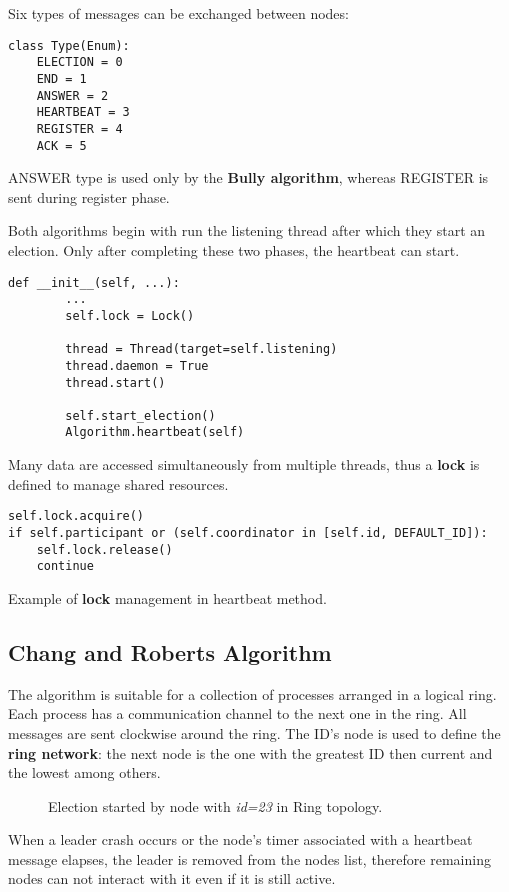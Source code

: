 \documentclass[conference]{IEEEtran}
\begin{document}
Six types of messages can be exchanged between nodes:

\begin{lstlisting}
class Type(Enum):
    ELECTION = 0
    END = 1
    ANSWER = 2
    HEARTBEAT = 3
    REGISTER = 4
    ACK = 5
\end{lstlisting}
ANSWER type is used only by the \textbf{Bully algorithm}, whereas REGISTER is sent during register phase.

Both algorithms begin with run the listening thread after which they start an election. Only after completing these two phases, the heartbeat can start. 
\begin{lstlisting}
def __init__(self, ...):
        ...
        self.lock = Lock()
        
        thread = Thread(target=self.listening)
        thread.daemon = True
        thread.start()

        self.start_election()
        Algorithm.heartbeat(self)
\end{lstlisting}
Many data are accessed simultaneously from multiple threads, thus a \textbf{lock} is defined to manage shared resources.
\begin{lstlisting}
self.lock.acquire()
if self.participant or (self.coordinator in [self.id, DEFAULT_ID]):
    self.lock.release()
    continue
\end{lstlisting}\caption{Example of \textbf{lock} management in heartbeat method.}

\subsection{Chang and Roberts Algorithm}\label{ring}

The algorithm is suitable for a collection of processes arranged in a logical ring. Each process has a
communication channel to the next one in the ring. All messages
are sent clockwise around the ring. The ID's node is used to define the \textbf{ring network}: the next node is the one with the greatest ID then current and the lowest among others.

\begin{figure}[htbp]
  \centering
  
  \caption{Election started by node with \textit{id=23} in Ring topology.}
\end{figure}

When a leader crash occurs or the node's timer associated with a heartbeat message elapses, the leader is removed from the nodes list, therefore remaining nodes can not interact with it even if it is still active.  
\end{document}
